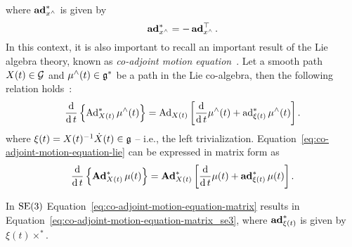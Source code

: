 where $\operatorname{\mathbf{ad}}^*_{x^\wedge}$ is given by
\begin{equation}
    \operatorname{\mathbf{ad}}^*_{x^\wedge} = -\operatorname{\mathbf{ad}}_{x^\wedge}^\top.
\end{equation}
In this context, it is also important to recall an important result of the Lie algebra theory, known as \emph{co-adjoint motion equation}~\citep[Proposition 4.2.5]{Holm2008GeometricRolling}. Let a smooth path $X(t) \in \mathcal{G}$ and $\mu^\wedge(t) \in \mathfrak{g}^*$ be a path in the Lie co-algebra, then the following relation holds~\citep[Proposition 4.2.5]{Holm2008GeometricRolling}:
\begin{equation}
\label{eq:co-adjoint-motion-equation-lie}
    \frac{\operatorname{d}}{\operatorname{d} t }\left\{\operatorname{Ad}^*_{X(t)} \mu^\wedge(t) \right \}=  \operatorname{Ad}_{X(t)} \left[ \frac{\operatorname{d}}{\operatorname{d} t} \mu^\wedge(t) + \operatorname{ad}^*_{\xi(t)}\mu^\wedge(t)   \right].
\end{equation}
where $\xi(t) = X(t)^{-1} \dot{X}(t) \in \mathfrak{g}$ -- i.e., the left trivialization.
Equation~\eqref{eq:co-adjoint-motion-equation-lie} can be expressed in matrix form as
\begin{equation}
\label{eq:co-adjoint-motion-equation-matrix}
     \frac{\operatorname{d}}{\operatorname{d} t } \left \{\operatorname{\mathbf{Ad}}^*_{X(t)} \mu(t) \right \} =  \operatorname{\mathbf{Ad}}^*_{X(t)} \left[ \frac{\operatorname{d}}{\operatorname{d} t} \mu(t) + \operatorname{\mathbf{ad}}^*_{\xi(t)}\mu(t)   \right].
\end{equation}
\par
In ${\mathrm{SE}}(3)$ Equation~\eqref{eq:co-adjoint-motion-equation-matrix} results in Equation~\eqref{eq:co-adjoint-motion-equation-matrix_se3}, where $\operatorname{\mathbf{ad}}^*_{\xi(t)}$ is given by $\xi(t) \times^*$.

